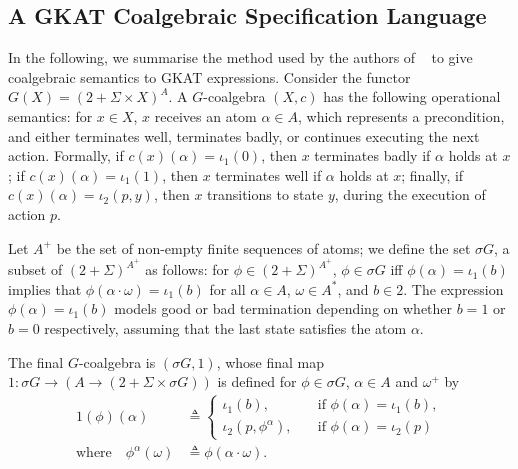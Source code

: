 
\subsection{A GKAT Coalgebraic Specification Language}
In the following, we summarise the method used by the authors of ~\cite{GKAT} to give coalgebraic semantics to GKAT expressions. Consider the functor $G(X)=(2+\Sigma\times X)^A$. A $G$-coalgebra $(X,c)$ has the following operational semantics: for $x\in X$, $x$ receives an atom $\alpha\in A$, which represents a precondition, and either terminates well, terminates badly, or continues executing the next action. Formally, if $c(x)(\alpha)=\iota_1(0)$, then $x$ terminates badly if $\alpha$ holds at $x$; if $c(x)(\alpha)=\iota_1(1)$, then $x$ terminates well if $\alpha$ holds at $x$; finally, if $c(x)(\alpha)=\iota_2(p,y)$, then $x$ transitions to state $y$, during the execution of action $p$. 

Let $A^{+}$ be the set of non-empty finite sequences of atoms; we define the set $\sigma G$, a subset of $(2+\Sigma)^{A^{+}}$ as follows: for $\phi \in (2+\Sigma)^{A^{+}}$, $\phi \in \sigma G$ iff $\phi(\alpha)=\iota_1(b)$ implies that $\phi(\alpha\cdot \omega)=\iota_1(b)$ for all $\alpha\in A$, $\omega\in A^*$, and $b\in2$. The expression $\phi(\alpha)=\iota_1(b)$ models good or bad termination depending on whether $b=1$ or $b=0$ respectively, assuming that the last state satisfies the atom $\alpha$. 

The final $G$-coalgebra is $(\sigma G, 1)$, whose final map $1\colon \sigma G\rightarrow (A\rightarrow (2+\Sigma\times\sigma G))$ is defined for $\phi\in \sigma G$, $\alpha\in A$ and $\omega^+$ by
\begin{align}
    1(\phi)(\alpha)&\triangleq
    \begin{cases}
        \iota_1(b),&\quad \text{if $\phi(\alpha)=\iota_1(b)$},\\
        \iota_2(p, \phi^\alpha),&\quad \text{if $\phi(\alpha)=\iota_2(p)$}
    \end{cases}\\
    \text{where}\quad
\phi^\alpha(\omega)&\triangleq \phi(\alpha\cdot \omega).
\end{align}

